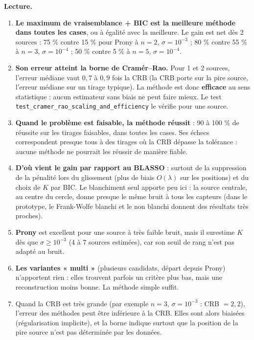 \documentclass[
  french,
]{article}
\providecommand{\tightlist}{%
  \setlength{\itemsep}{0pt}\setlength{\parskip}{0pt}}
\begin{document}
\textbf{Lecture.}

\begin{enumerate}
\def\labelenumi{\arabic{enumi}.}
\tightlist
\item
  \textbf{Le maximum de vraisemblance + BIC est la meilleure méthode
  dans toutes les cases}, ou à égalité avec la meilleure. Le gain est
  net dès 2 sources : 75 \% contre 15 \% pour Prony à \(n = 2\),
  \(\sigma = 10^{-3}\) ; 80 \% contre 55 \% à \(n = 3\),
  \(\sigma = 10^{-4}\) ; 50 \% contre 5 \% à \(n = 5\),
  \(\sigma = 10^{-4}\).
\item
  \textbf{Son erreur atteint la borne de Cramér--Rao.} Pour 1 et 2
  sources, l'erreur médiane vaut \(0{,}7\) à \(0{,}9\) fois la CRB (la
  CRB porte sur la pire source, l'erreur médiane sur un tirage typique).
  La méthode est donc \textbf{efficace} au sens statistique : aucun
  estimateur sans biais ne peut faire mieux. Le test
  \texttt{test\_cramer\_rao\_scaling\_and\_efficiency} le vérifie pour
  une source.
\item
  \textbf{Quand le problème est faisable, la méthode réussit} : 90 à 100
  \% de réussite sur les tirages faisables, dans toutes les cases. Ses
  échecs correspondent presque tous à des tirages où la CRB dépasse la
  tolérance : aucune méthode ne pourrait les réussir de manière fiable.
\item
  \textbf{D'où vient le gain par rapport au BLASSO} : surtout de la
  suppression de la pénalité lors du glissement (plus de biais
  \(O(\lambda)\) sur les positions) et du choix de \(K\) par BIC. Le
  blanchiment seul apporte peu ici : la source centrale, au centre du
  cercle, donne presque le même bruit à tous les capteurs (dans le
  prototype, le Frank-Wolfe blanchi et le non blanchi donnent des
  résultats très proches).
\item
  \textbf{Prony} est excellent pour une source à très faible bruit, mais
  il surestime \(K\) dès que \(\sigma\ge 10^{-3}\) (4 à 7 sources
  estimées), car son seuil de rang n'est pas adapté au bruit.
\item
  \textbf{Les variantes « multi »} (plusieurs candidats, départ depuis
  Prony) n'apportent rien : elles trouvent parfois un critère plus bas,
  mais une reconstruction moins bonne. La méthode simple suffit.
\item
  Quand la CRB est très grande (par exemple \(n = 3\),
  \(\sigma = 10^{-3}\) : CRB \(= 2{,}2\)), l'erreur des méthodes peut
  être inférieure à la CRB. Elles sont alors biaisées (régularisation
  implicite), et la borne indique surtout que la position de la pire
  source n'est pas déterminée par les données.
\end{enumerate}
\end{document}
